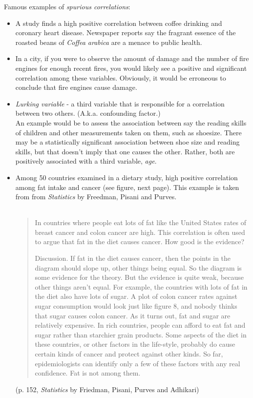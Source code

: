 Famous examples of {\em spurious correlations}:
\begin{itemize}
\item A study finds a high positive correlation between coffee drinking and coronary heart disease.  Newspaper reports say the fragrant essence of the roasted beans of {\em Coffea arabica} are a menace to public health.
\item In a city, if you were to observe the amount of damage and the number of fire engines for enough recent fires, you would likely see a positive and significant correlation among these variables.  Obviously, it would be erroneous to conclude that fire engines cause damage.
\item {\em Lurking variable} - a third variable that is responsible for a correlation between two others.  (A.k.a. confounding factor.)\\
An example would be to assess the association between say the reading skills of children and other measurements taken on them, such as shoesize.  There 
may be a statistically significant association between shoe size and reading skills, but that doesn't imply that one causes the other.  Rather, both are positively associated with a third variable, {\em age}.
\item Among 50 countries examined in a dietary study, high positive correlation among fat intake and cancer (see figure, next page).  This example is taken from from {\em Statistics} by Freedman, Pisani and Purves.\\~\\
\begin{quotation} 
In countries where people eat lots of fat like the United States rates of breast cancer and colon cancer are high. This correlation is often used to argue that fat in the diet causes cancer. How good is the evidence?

Discussion. If fat in the diet causes cancer, then the points in the diagram should slope up, other things being equal. So the diagram is some evidence for the theory. But the evidence is quite weak, because other things aren't equal. For example, the countries with lots of fat in the diet also have lots of sugar. A plot of colon cancer rates against sugar consumption would look just like figure 8, and nobody thinks that sugar causes colon cancer. As it turns out, fat and sugar are relatively expensive. In rich countries, people can afford to eat fat
and sugar rather than starchier grain products. Some aspects of the diet in these countries, or other factors in the life-style, probably do cause certain kinds of cancer and protect against other kinds. So far, epidemiologists can identify only a few of these factors with any real confidence. Fat is not among them. 
\end{quotation} 
(p. 152, {\em Statistics} by Friedman, Pisani, Purves and Adhikari)
\end{itemize}

